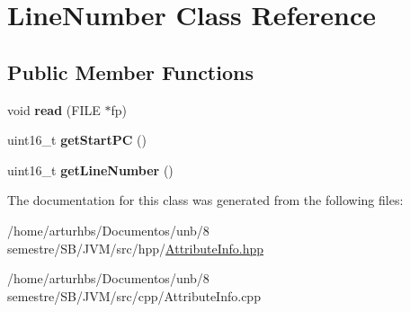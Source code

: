 \hypertarget{classLineNumber}{}\section{Line\+Number Class Reference}
\label{classLineNumber}
\subsection*{Public Member Functions}
\begin{DoxyCompactItemize}
\item 
void {\bfseries read} (F\+I\+LE $\ast$fp)\hypertarget{classLineNumber_a0ba6d96af3e99d0d235b48247852d3a0}{}\label{classLineNumber_a0ba6d96af3e99d0d235b48247852d3a0}

\item 
uint16\+\_\+t {\bfseries get\+Start\+PC} ()\hypertarget{classLineNumber_abf15057e0389883a4401e42e399ebce5}{}\label{classLineNumber_abf15057e0389883a4401e42e399ebce5}

\item 
uint16\+\_\+t {\bfseries get\+Line\+Number} ()\hypertarget{classLineNumber_a69150854a991eba36b8ef7916d6dae10}{}\label{classLineNumber_a69150854a991eba36b8ef7916d6dae10}

\end{DoxyCompactItemize}


The documentation for this class was generated from the following files\+:\begin{DoxyCompactItemize}
\item 
/home/arturhbs/\+Documentos/unb/8 semestre/\+S\+B/\+J\+V\+M/src/hpp/\hyperlink{AttributeInfo_8hpp}{Attribute\+Info.\+hpp}\item 
/home/arturhbs/\+Documentos/unb/8 semestre/\+S\+B/\+J\+V\+M/src/cpp/Attribute\+Info.\+cpp\end{DoxyCompactItemize}
